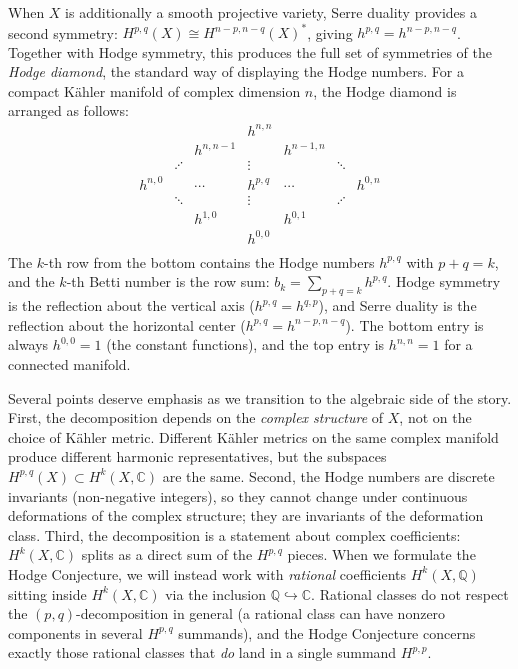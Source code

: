 \documentclass{article}
\newcommand{\C}{\mathbb{C}}
\newcommand{\Q}{\mathbb{Q}}
\begin{document}
When $X$ is additionally a smooth projective variety, Serre duality provides a
second symmetry: $H^{p,q}(X) \cong H^{n-p,n-q}(X)^*$, giving
$h^{p,q} = h^{n-p,n-q}$. Together with Hodge symmetry, this produces the full
set of symmetries of the \emph{Hodge diamond}, the standard way of displaying
the Hodge numbers. For a compact K\"{a}hler manifold of complex dimension $n$,
the Hodge diamond is arranged as follows:
\[
  \begin{array}{ccccccccc}
    & & & & h^{n,n} & & & & \\
    & & & h^{n,n-1} & & h^{n-1,n} & & & \\
    & & \iddots & & \vdots & & \ddots & & \\
    & h^{n,0} & & \cdots & h^{p,q} & \cdots & & h^{0,n} & \\
    & & \ddots & & \vdots & & \iddots & & \\
    & & & h^{1,0} & & h^{0,1} & & & \\
    & & & & h^{0,0} & & & & \\
  \end{array}
\]
The $k$-th row from the bottom contains the Hodge numbers $h^{p,q}$ with
$p + q = k$, and the $k$-th Betti number is the row sum:
$b_k = \sum_{p+q=k} h^{p,q}$. Hodge symmetry is the reflection about the
vertical axis ($h^{p,q} = h^{q,p}$), and Serre duality is the reflection
about the horizontal center ($h^{p,q} = h^{n-p,n-q}$). The bottom entry is
always $h^{0,0} = 1$ (the constant functions), and the top entry is
$h^{n,n} = 1$ for a connected manifold.

Several points deserve emphasis as we transition to the algebraic side of
the story. First, the decomposition depends on the \emph{complex structure}
of $X$, not on the choice of K\"{a}hler metric. Different K\"{a}hler metrics
on the same complex manifold produce different harmonic representatives, but
the subspaces $H^{p,q}(X) \subset H^k(X, \C)$ are the same. Second, the
Hodge numbers are discrete invariants (non-negative integers), so they cannot
change under continuous deformations of the complex structure; they are
invariants of the deformation class. Third, the decomposition is a statement
about complex coefficients: $H^k(X, \C)$ splits as a direct sum of the
$H^{p,q}$ pieces. When we formulate the Hodge Conjecture, we will instead
work with \emph{rational} coefficients $H^k(X, \Q)$ sitting inside
$H^k(X, \C)$ via the inclusion $\Q \hookrightarrow \C$. Rational classes do
not respect the $(p,q)$-decomposition in general (a rational class can have
nonzero components in several $H^{p,q}$ summands), and the Hodge Conjecture
concerns exactly those rational classes that \emph{do} land in a single
summand $H^{p,p}$.
\end{document}

